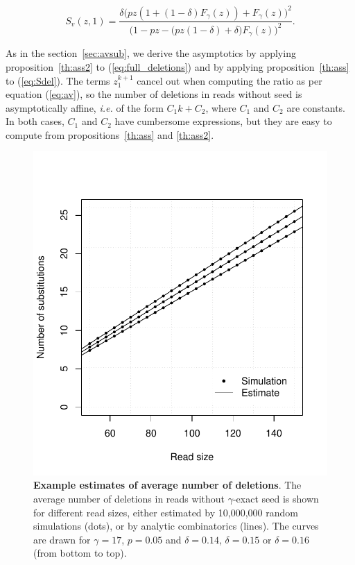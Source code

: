 \documentclass{article}
\begin{document}
\begin{equation}
\label{eq:full_deletions}
S_v(z,1) =
\frac{\delta\big( pz(1+(1-\delta)F_\gamma(z))+F_\gamma(z) \big)^2}
{\big( 1-pz - \big(pz(1-\delta) + \delta\big)F_\gamma(z) \big)^2}.
\end{equation}

As in the section~\ref{sec:avsub}, we derive the asymptotics by applying
proposition~\ref{th:ass2} to (\ref{eq:full_deletions}) and by applying
proposition~\ref{th:ass} to (\ref{eq:Sdel}). The terms $z_1^{k+1}$ cancel
out when computing the ratio as per equation (\ref{eq:av}), so the number
of deletions in reads without seed is asymptotically affine, \textit{i.e.}
of the form $C_1k+C_2$, where $C_1$ and $C_2$ are constants. In both
cases, $C_1$ and $C_2$ have cumbersome expressions, but they are easy to
compute from propositions~\ref{th:ass} and \ref{th:ass2}.

\begin{figure}[h]
\centering
\includegraphics[scale=0.445]{simuldel-average2.pdf}
\caption{\textbf{Example estimates of average number of deletions}. The
average number of deletions in reads without $\gamma$-exact seed is
shown for different read sizes, either estimated by 10,000,000 random
simulations (dots), or by analytic combinatorics (lines). The curves are
drawn for $\gamma=17$, $p=0.05$ and $\delta=0.14$, $\delta=0.15$ or
$\delta=0.16$ (from bottom to top).}
\label{fig:simulavdel}
\end{figure}
\end{document}
